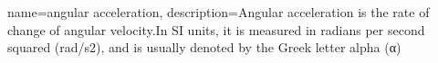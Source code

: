 {
    name=angular acceleration,
    description={Angular acceleration is the rate of change of angular velocity.In SI units, it is measured in radians per second squared (rad/s2), and is usually denoted by the Greek letter alpha (α)}
}
